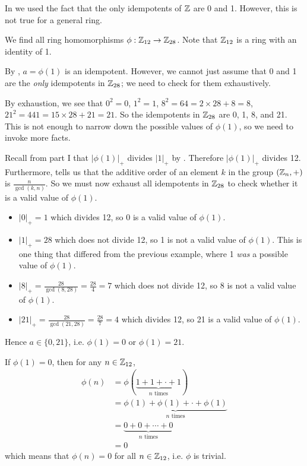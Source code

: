In  we used the fact that the only idempotents of $\mathbb{Z}$ are 0 and 1. However, this is not true for a general ring.

\begin{example}\label{example-homomorphisms-from-Z12-to-Z28}
    We find all ring homomorphisms $\phi: \mathbb{Z}_{12} \to \mathbb{Z}_{28}$. Note that $\mathbb{Z}_{12}$ is a ring with an identity of 1.

    By , $a = \phi(1)$ is an idempotent. However, we cannot just assume that 0 and 1 are the \textit{only} idempotents in $\mathbb{Z}_{28}$; we need to check for them exhaustively.

    By exhaustion, we see that $0^2 = 0$, $1^2 = 1$, $8^2 = 64 = 2 \times 28 + 8 = 8$, $21^2 = 441 = 15 \times 28 + 21 = 21$. So the idempotents in $\mathbb{Z}_{28}$ are 0, 1, 8, and 21. This is not enough to narrow down the possible values of $\phi(1)$, so we need to invoke more facts.

    Recall from part I that $|\phi(1)|_+$ divides $|1|_+$ by . Therefore $|\phi(1)|_+$ divides 12. Furthermore,  tells us that the additive order of an element $k$ in the group $(\mathbb{Z}_n, +)$ is $\frac{n}{\gcd(k,n)}$. So we must now exhaust all idempotents in $\mathbb{Z}_{28}$ to check whether it is a valid value of $\phi(1)$.
    \begin{itemize}
        \item $|0|_+ = 1$ which divides 12, so 0 is a valid value of $\phi(1)$.
        \item $|1|_+ = 28$ which does not divide 12, so 1 is not a valid value of $\phi(1)$. This is one thing that differed from the previous example, where 1 \textit{was} a possible value of $\phi(1)$.
        \item $|8|_+ = \frac{28}{\gcd(8,28)} = \frac{28}4 = 7$ which does not divide 12, so 8 is not a valid value of $\phi(1)$.
        \item $|21|_+ = \frac{28}{\gcd(21,28)} = \frac{28}7 = 4$ which divides 12, so 21 is a valid value of $\phi(1)$.
    \end{itemize}
    Hence $a \in \{0, 21\}$, i.e. $\phi(1) = 0$ or $\phi(1) = 21$.

    If $\phi(1) = 0$, then for any $n \in \mathbb{Z}_{12}$,
    \begin{align*}
        \phi(n) &= \phi(\underbrace{1 + 1 + \cdot + 1}_{n \text{ times}})\\
        &= \underbrace{\phi(1) + \phi(1) + \cdot + \phi(1)}_{n \text{ times}}\\
        &= \underbrace{0 + 0 + \cdots + 0}_{n \text{ times}}\\
        &= 0
    \end{align*}
    which means that $\phi(n) = 0$ for all $n \in \mathbb{Z}_{12}$, i.e. $\phi$ is trivial.


\end{example}
